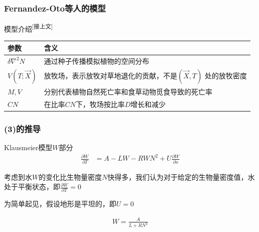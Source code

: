 \documentclass[aspectratio=169, 12pt, utf8, mathserif]{ctexbeamer} %
\begin{document}
\begin{frame}
	\frametitle{Fernandez-Oto等人的模型}
	\begin{exampleblock}{模型介绍\textsuperscript{{\tiny [接上文]}}}
		\begin{center}
			\begin{tabular}{p{5cm}p{9cm}}
				\toprule
				参数 & 含义 \\
				\midrule
				$\delta\nabla^{2}N$ & 通过种子传播模拟植物的空间分布 \\
				$V(T;\vec{X})$ & 放牧场，表示放牧对草地退化的贡献，不是$(\vec{X},T)$ 处的放牧密度 \\
				$M,V$ & 分别代表植物自然死亡率和食草动物觅食导致的死亡率 \\
				$CN$ & 在比率$CN$下，牧场按比率$D$增长和减少 \\
				\bottomrule
			\end{tabular}
		\end{center}
	\end{exampleblock}
\end{frame}


	




\begin{frame}
	\frametitle{(3)的推导}
	\begin{exampleblock}{Klausmeier模型\(W\)部分}
		\begin{align*}
			\frac{\partial W}{\partial T} &= A - LW - RWN^2 + U\frac{\partial W}{\partial x}
		\end{align*}
		\begin{itemize}
{\small
	 	\item 考虑到水\(W\)的变化比生物量密度\(N\)快得多，我们认为对于给定的生物量密度值，水处于平衡状态，即\(\frac{\partial W}{\partial T}=0\)\\
		\item 为简单起见，假设地形是平坦的，即\(U = 0\)
}
        \begin{align*}
        	W=\frac A{L+RN^2}
        \end{align*}
		\end{itemize}
	\end{exampleblock}
\end{frame}
\end{document}
